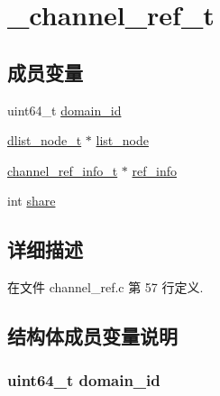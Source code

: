 \hypertarget{struct__channel__ref__t}{}\section{\+\_\+channel\+\_\+ref\+\_\+t}
\label{struct__channel__ref__t}
\subsection*{成员变量}
\begin{DoxyCompactItemize}
\item 
uint64\+\_\+t \hyperlink{struct__channel__ref__t_a2243d1c6a9d72aeb7c6d6e5331d5d64f}{domain\+\_\+id}
\item 
\hyperlink{config_8h_a62053232bcf3566010ef98a7d77c3cc8}{dlist\+\_\+node\+\_\+t} $\ast$ \hyperlink{struct__channel__ref__t_a1077e5b0269760e53b61c2d62c5ae6a3}{list\+\_\+node}
\item 
\hyperlink{channel__ref_8c_a3c8048d6abb647710be83f9b243c7822}{channel\+\_\+ref\+\_\+info\+\_\+t} $\ast$ \hyperlink{struct__channel__ref__t_aa3cf0e0ca3d1339d0d00bf4426a02be1}{ref\+\_\+info}
\item 
int \hyperlink{struct__channel__ref__t_a8e20e19103b7aff089f5432163078226}{share}
\end{DoxyCompactItemize}


\subsection{详细描述}


在文件 channel\+\_\+ref.\+c 第 57 行定义.



\subsection{结构体成员变量说明}
\hypertarget{struct__channel__ref__t_a2243d1c6a9d72aeb7c6d6e5331d5d64f}{}
\subsubsection[{domain\+\_\+id}]{\setlength{\rightskip}{0pt plus 5cm}uint64\+\_\+t domain\+\_\+id}\label{struct__channel__ref__t_a2243d1c6a9d72aeb7c6d6e5331d5d64f}


